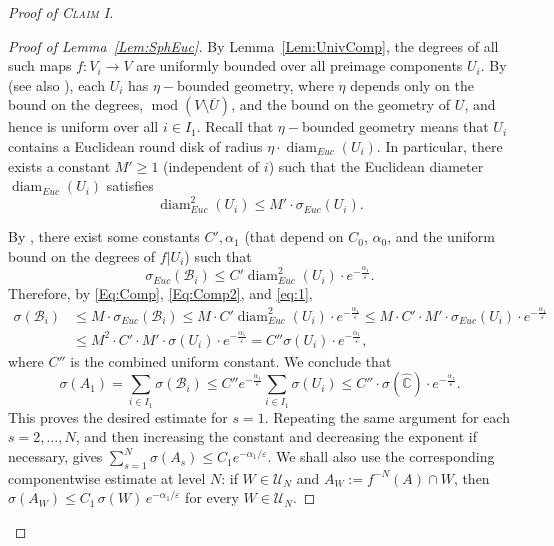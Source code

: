 \documentclass[11pt,a4paper, oneside]{amsart}
\theoremstyle{definition}
\theoremstyle{remark}
\DeclareMathOperator{\diam}{diam}
\numberwithin{equation}{section}
\newcommand{\Mod}{\operatorname{mod}}
\renewcommand{\ge}{\geqslant}
\renewcommand{\le}{\leqslant}
\newcommand{\eps}{\varepsilon}
\newcommand{\ovl}{\overline}
\newcommand{\C}{\mathbb{C}}
\newcommand{\Cc}{\widehat{{\C}}}
\newcommand{\sm}{\setminus}
\begin{document}
\begin{proof}[Proof of \textsc{Claim I}]
\begin{proof}[Proof of Lemma~\ref{Lem:SphEuc}]
By Lemma~\ref{Lem:UnivComp}, the degrees of all such maps $f \colon V_i \to V$ are uniformly bounded over all preimage components $U_i$. By \cite[Lemma A.7]{CDKS} (see also \cite[Fact 6.2]{KSS}), each $U_i$ has $\eta-$bounded geometry, where $\eta$ depends only on the bound on the degrees, $\Mod(V\sm \ovl U)$, and the bound on the geometry of $U$, and hence is uniform over all $i \in I_1$. Recall that $\eta-$bounded geometry means that $U_i$ contains a Euclidean round disk of radius $\eta \cdot \diam_{Euc}(U_i)$.  In particular, there exists a constant $M' \ge 1$ (independent of $i$) such that the Euclidean diameter $\diam_{Euc}(U_i)$ satisfies 
\begin{equation}
\label{Eq:Comp2}
\diam^2_{Euc}(U_i) \le M'\cdot \sigma_{Euc}(U_i).
\end{equation}

By \cite[Lemma 6.4]{Zha16}, there exist some constants $C', \alpha_1$ (that depend on $C_0$, $\alpha_0$, and the uniform bound on the degrees of $f|U_i$) such that
\begin{equation}
\label{eq:1}
\sigma_{Euc}(\mathcal{B}_i) \le C' \diam_{Euc}^2(U_i) \cdot e^{-\frac{\alpha_1}{\eps}}.
\end{equation} 
Therefore, by \eqref{Eq:Comp}, \eqref{Eq:Comp2}, and \eqref{eq:1},
\begin{equation*}
    \begin{aligned}
\sigma(\mathcal{B}_i) &\le M \cdot \sigma_{Euc}(\mathcal{B}_i) \le M \cdot C' \diam_{Euc}^2(U_i) \cdot e^{-\frac{\alpha_1}{\eps}} \le M \cdot C' \cdot M' \cdot \sigma_{Euc}(U_i) \cdot e^{-\frac{\alpha_1}{\eps}} \\ &\le M^2 \cdot C' \cdot M' \cdot \sigma(U_i) \cdot e^{-\frac{\alpha_1}{\eps}} = C'' \sigma(U_i) \cdot e^{-\frac{\alpha_1}{\eps}},
    \end{aligned}
\end{equation*} 
where $C''$ is the combined uniform constant. We conclude that 
\begin{equation}
\label{Eq:Conclusion}
{\sigma(A_1)} = \sum_{i \in I_1} \sigma(\mathcal{B}_i) \le C'' e^{-\frac{\alpha_1}{\eps}} \sum_{i\in I_1} \sigma(U_i) \le C'' \cdot \sigma(\Cc) \cdot e^{-\frac{\alpha_1}{\eps}}.
\end{equation}
{This proves the desired estimate for $s=1$. Repeating the same argument for each $s=2,\ldots,N$, and then increasing the constant and decreasing the exponent if necessary, gives $\sum_{s=1}^{N}\sigma(A_s)\le C_1 e^{-\alpha_1/\eps}$. We shall also use the corresponding componentwise estimate at level $N$: if $W\in\mathcal U_N$ and $A_W:=f^{-N}(A)\cap W$, then $\sigma(A_W)\le C_1\,\sigma(W)\,e^{-\alpha_1/\eps}$ for every $W\in\mathcal U_N.$}


\end{proof}
\end{proof}
\end{document}
